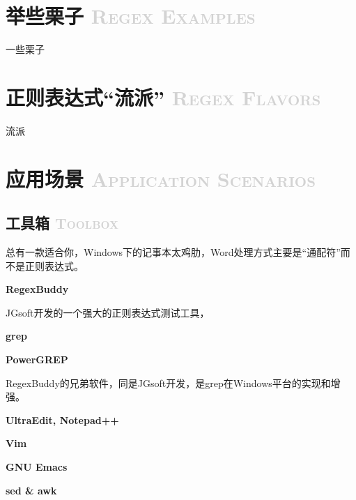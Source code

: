 \documentclass[12pt,a4paper,twoside]{ctexart}
\begin{document}
\section[举些栗子]{举些栗子 \textcolor{lightgray}{\textsc{Regex Examples}}}
\label{sec:regex-examples}

\begin{multicols}{2}
一些栗子 \par


\end{multicols}

\section[正则表达式“流派”]{正则表达式“流派” \textcolor{lightgray}{\textsc{Regex Flavors}}}
\label{sec:flavor}

\begin{multicols}{2}
流派

\end{multicols}


\section[应用场景]{应用场景 \textcolor{lightgray}{\textsc{Application Scenarios}}}
\label{sec:scenarios}

\subsection[工具箱]{工具箱 \textcolor{lightgray}{\textsc{Toolbox}}}
\label{sec:toolbox}

总有一款适合你，Windows下的记事本太鸡肋，Word处理方式主要是“通配符”而不是正则表达式。 \par

\begin{multicols}{2}
  
\noindent\textbf{RegexBuddy} \par
JGsoft开发的一个强大的正则表达式测试工具， \par

\noindent\textbf{grep}

\noindent\textbf{PowerGREP} \par
RegexBuddy的兄弟软件，同是JGsoft开发，是grep在Windows平台的实现和增强。

\noindent\textbf{UltraEdit, Notepad++}

\noindent\textbf{Vim} \par

\noindent\textbf{GNU Emacs} \par

\noindent\textbf{sed \& awk}

\end{multicols}
\end{document}

